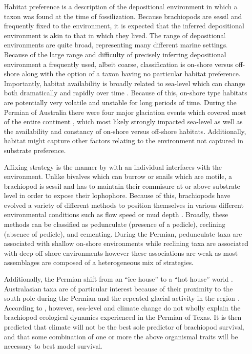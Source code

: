 \documentclass[12pt,letterpaper]{article}
\begin{document}
Habitat preference is a description of the depositional environment in which a taxon was found at the time of fossilization. Because brachiopods are sessil and frequently fixed to the environment, it is expected that the inferred depositional environment is akin to that in which they lived. The range of depositional environments are quite broad, representing many different marine settings. Because of the large range and difficulty of precisely inferring depositional environment a frequently used, albeit coarse, classification is on-shore versus off-shore \citep{Sepkoski1991,Kiessling2007a,Bottjer1988,Jablonski1991,Jablonski1983b} along with the option of a taxon having no particular habitat preference. Importantly, habitat availability is broadly related to sea-level which can change both dramatically and rapidly over time \citep{Olszewski2004}. Because of this, on-shore type habitats are potentially very volatile and unstable for long periods of time. During the Permian of Australia there were four major glaciation events which covered most of the entire continent \citep{Fielding2008,Birgenheier2010,Fielding2008a,Fielding2006}, which most likely strongly impacted sea-level as well as the availability and constancy of on-shore versus off-shore habitats. Additionally, habitat might capture other factors relating to the environment not captured in substrate preference. 

Affixing strategy is the manner by with an individual interfaces with the environment. Unlike bivalves which can burrow or snails which are motile, a brachiopod is sessil and has to maintain their commisure at or above substrate level in order to expose their lophophore. Because of this, brachiopods have evolved a variety of different methods to position themselves in various different environmental conditions such as flow speed or mud depth \citep{Alexander1977,LaBarbera1978,LaBarbera1981,Richardson1997}. Broadly, these methods can be classified as pedunculate (presence of a pedicle), reclining (absence of pedicle), and cementing. During the Permian, pedunculate taxa are associated with shallow on-shore environments while reclining taxa are associated with deep off-shore environments \citep{Clapham2007} however these associations are weak as most assemblages are composed of a heterogeneous mix of strategies.

Additionally, the Permian shift from an ``ice house'' to a ``hot house'' world \citep{Fielding2006,Birgenheier2010,Jones2006,Powell2007,Fielding2008}. Australasian taxa are of particular interest because of their proximity to the south pole during the Permian and the repeated glacial activity in the region \citep{Fielding2008a,Fielding2006,Birgenheier2010,Jones2006}. According to \citet{Olszewski2004}, however, sea-level and climate change do not wholly explain the brachiopod ecological dynamics experienced in the Permian of Texas. It is then predicted that climate will not be the best sole predictor of brachiopod survival, and that some combination of one or more the above organismal traits will be necessary to best model survival. 
\end{document}
